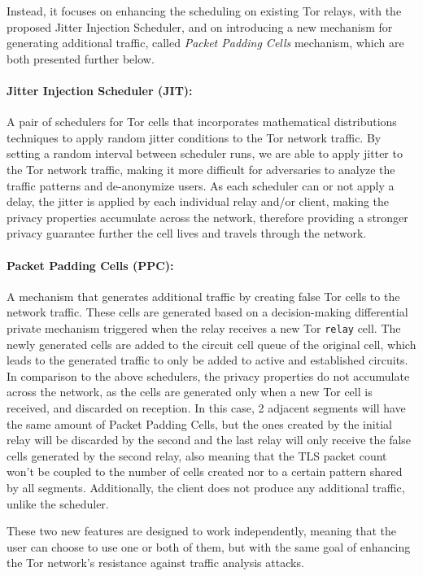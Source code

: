Instead, it focuses on enhancing the scheduling on existing Tor relays, with the proposed Jitter Injection Scheduler, and on introducing a new mechanism for generating additional traffic, called \textit{Packet Padding Cells} mechanism, which are both presented further below.

\paragraph{Jitter Injection Scheduler (JIT):} A pair of schedulers for Tor cells that incorporates mathematical distributions techniques to apply random jitter conditions to the Tor network traffic. By setting a random interval between scheduler runs, we are able to apply jitter to the Tor network traffic, making it more difficult for adversaries to analyze the traffic patterns and de-anonymize users. As each scheduler can or not apply a delay, the jitter is applied by each individual relay and/or client, making the privacy properties accumulate across the network, therefore providing a stronger privacy guarantee further the cell lives and travels through the network.
\paragraph{Packet Padding Cells (PPC):} A mechanism that generates additional traffic by creating false Tor cells to the network traffic. These cells are generated based on a decision-making differential private mechanism triggered when the relay receives a new Tor \texttt{relay} cell. The newly generated cells are added to the circuit cell queue of the original cell, which leads to the generated traffic to only be added to active and established circuits.  In comparison to the above schedulers, the privacy properties do not accumulate across the network, as the cells are generated only when a new Tor cell is received, and discarded on reception. 
In this case, 2 adjacent segments will have the same amount of Packet Padding Cells, but the ones created by the initial relay will be discarded by the second and the last relay will only receive the false cells generated by the second relay, also meaning that the TLS packet count won't be coupled to the number of cells created nor to a certain pattern shared by all segments. Additionally, the client does not produce any additional traffic, unlike the scheduler.

These two new features are designed to work independently, meaning that the user can choose to use one or both of them, but with the same goal of enhancing the Tor network's resistance against traffic analysis attacks.


